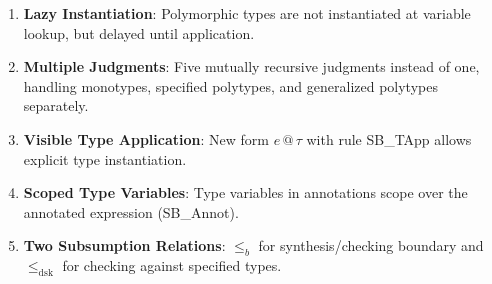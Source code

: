 \documentclass[11pt,a4paper]{article}
\begin{document}
\begin{enumerate}
\item \textbf{Lazy Instantiation}: Polymorphic types are not instantiated at variable lookup, but delayed until application.

\item \textbf{Multiple Judgments}: Five mutually recursive judgments instead of one, handling monotypes, specified polytypes, and generalized polytypes separately.

\item \textbf{Visible Type Application}: New form $e \,@\,\tau$ with rule SB\_TApp allows explicit type instantiation.

\item \textbf{Scoped Type Variables}: Type variables in annotations scope over the annotated expression (SB\_Annot).

\item \textbf{Two Subsumption Relations}: $\leq_b$ for synthesis/checking boundary and $\leq_{\mathrm{dsk}}$ for checking against specified types.
\end{enumerate}
\end{document}

